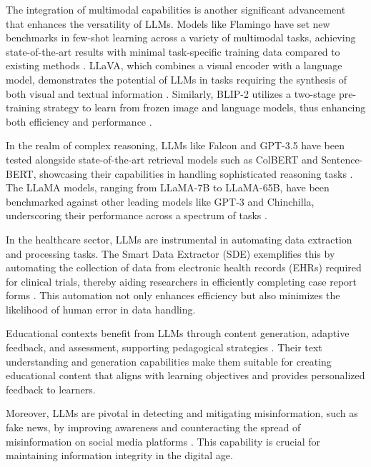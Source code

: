The integration of multimodal capabilities is another significant advancement that enhances the versatility of LLMs. Models like Flamingo have set new benchmarks in few-shot learning across a variety of multimodal tasks, achieving state-of-the-art results with minimal task-specific training data compared to existing methods \cite{alayrac2022flamingo}. LLaVA, which combines a visual encoder with a language model, demonstrates the potential of LLMs in tasks requiring the synthesis of both visual and textual information \cite{liu2024visual}. Similarly, BLIP-2 utilizes a two-stage pre-training strategy to learn from frozen image and language models, thus enhancing both efficiency and performance \cite{li2023blip}.



In the realm of complex reasoning, LLMs like Falcon and GPT-3.5 have been tested alongside state-of-the-art retrieval models such as ColBERT and Sentence-BERT, showcasing their capabilities in handling sophisticated reasoning tasks \cite{reddy2024docfinqalongcontextfinancialreasoning}. The LLaMA models, ranging from LLaMA-7B to LLaMA-65B, have been benchmarked against other leading models like GPT-3 and Chinchilla, underscoring their performance across a spectrum of tasks \cite{touvron2023llama}.



In the healthcare sector, LLMs are instrumental in automating data extraction and processing tasks. The Smart Data Extractor (SDE) exemplifies this by automating the collection of data from electronic health records (EHRs) required for clinical trials, thereby aiding researchers in efficiently completing case report forms \cite{quennelle2023smartdataextractorclinician}. This automation not only enhances efficiency but also minimizes the likelihood of human error in data handling.



Educational contexts benefit from LLMs through content generation, adaptive feedback, and assessment, supporting pedagogical strategies \cite{kasneci2023chatgpt}. Their text understanding and generation capabilities make them suitable for creating educational content that aligns with learning objectives and provides personalized feedback to learners.



Moreover, LLMs are pivotal in detecting and mitigating misinformation, such as fake news, by improving awareness and counteracting the spread of misinformation on social media platforms \cite{shu2017fakenewsdetectionsocial}. This capability is crucial for maintaining information integrity in the digital age.



